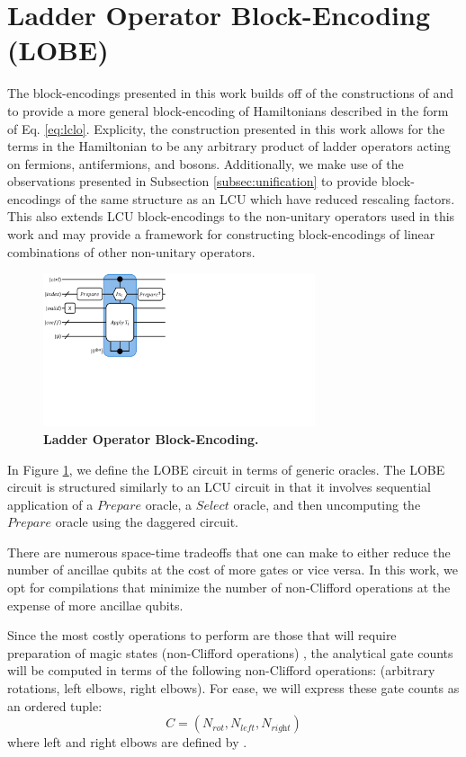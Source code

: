 \section{Ladder Operator Block-Encoding (LOBE)}
\label{sec:lobe}

The block-encodings presented in this work builds off of the constructions of \cite{camps2024explicit} and \cite{liu2024efficient} to provide a more general block-encoding of Hamiltonians described in the form of Eq. \ref{eq:lclo}.
Explicity, the construction presented in this work allows for the terms in the Hamiltonian to be any arbitrary product of ladder operators acting on fermions, antifermions, and bosons.
Additionally, we make use of the observations presented in Subsection \ref{subsec:unification} to provide block-encodings of the same structure as an LCU which have reduced rescaling factors.
This also extends LCU block-encodings to the non-unitary operators used in this work and may provide a framework for constructing block-encodings of linear combinations of other non-unitary operators.

\begin{figure}
    \centering
    \includegraphics[width=8cm]{figures/lobe.pdf}
    \caption{\textbf{Ladder Operator Block-Encoding.}
    }
    \label{fig:lobe}
\end{figure}

In Figure \ref{fig:lobe}, we define the LOBE circuit in terms of generic oracles.
The LOBE circuit is structured similarly to an LCU circuit in that it involves sequential application of a $\textit{Prepare}$ oracle, a $\textit{Select}$ oracle, and then uncomputing the $\textit{Prepare}$ oracle using the daggered circuit.

There are numerous space-time tradeoffs that one can make to either reduce the number of ancillae qubits at the cost of more gates or vice versa.
In this work, we opt for compilations that minimize the number of non-Clifford operations at the expense of more ancillae qubits.

Since the most costly operations to perform are those that will require preparation of magic states (non-Clifford operations) , the analytical gate counts will be computed in terms of the following non-Clifford operations: (arbitrary rotations, left elbows, right elbows).
For ease, we will express these gate counts as an ordered tuple:
\begin{equation}
    \label{eq:gate-counts}
    C = (N_{\textit{rot}}, N_{\textit{left}}, N_{\textit{right}})
\end{equation}
where left and right elbows are defined by \cite{babbush2018encoding}.

